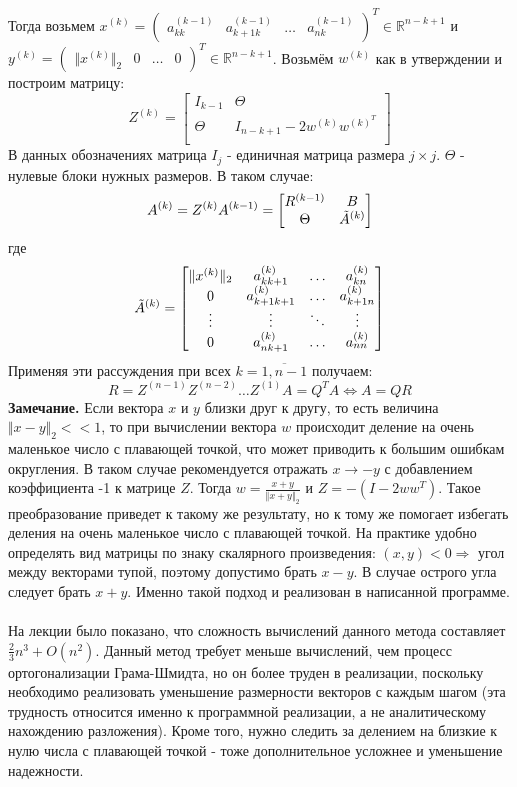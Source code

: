 \documentclass[a4paper,12pt,titlepage,final]{article}
\begin{document}
Тогда возьмем  $x^{(k)} = \begin{pmatrix} a_{kk}^{(k-1)} & a_{k+1k}^{(k-1)} & \ldots & a_{nk}^{(k-1)}\end{pmatrix}^T \in \mathbb{R}^{n-k+1}$ и  $y^{(k)} = \begin{pmatrix} \Vert x^{(k)} \Vert_2 & 0 & \ldots & 0\end{pmatrix}^T \in \mathbb{R}^{n-k+1}$. Возьмём $w^{(k)}$ как в утверждении и построим матрицу:
$$Z^{(k)} = \begin{bmatrix}
    I_{k-1} & \Theta \\
    \Theta & I_{n - k + 1} - 2w^{(k)}w^{(k)^T} \\
\end{bmatrix} $$
В данных обозначениях матрица $I_j$ - единичная матрица размера $j \times j$. $\Theta$ - нулевые блоки нужных размеров. В таком случае:
$$A^{(k)} = Z^{(k)}A^{(k-1)} = \begin{bmatrix}
    R^{(k-1)} & B \\
    \Theta & \Tilde{A}^{(k)}
\end{bmatrix}
$$
где $$
\Tilde{A}^{(k)} = \begin{bmatrix}
    \Vert x^{(k)} \Vert_2 & a_{kk+1}^{(k)} & \ldots & a_{kn}^{(k)} \\
    0 & a_{k+1k+1}^{(k)} & \ldots & a_{k+1n}^{(k)} \\
    \vdots & \vdots & \ddots & \vdots \\
    0 & a_{nk+1}^{(k)} & \ldots & a_{nn}^{(k)} \\
\end{bmatrix}
$$
Применяя эти рассуждения при всех $k = \overline{1, n-1}$ получаем:
$$R = Z^{(n-1)}Z^{(n-2)}\ldots Z^{(1)}A = Q^TA \Leftrightarrow A = QR$$
\textbf{Замечание.} Если вектора $x$ и $y$ близки друг к другу, то есть величина $\Vert x - y \Vert_2 << 1$, то при вычислении вектора $w$ происходит деление на очень маленькое число с плавающей точкой, что может приводить к большим ошибкам округления. В таком случае рекомендуется отражать $x \to -y$ с добавлением коэффициента -1 к матрице $Z$. Тогда $w = \frac{x + y}{\Vert x + y \Vert_2}$ и $Z = -(I - 2ww^T)$. Такое преобразование приведет к такому же результату, но к тому же помогает избегать деления на очень маленькое число с плавающей точкой. На практике удобно определять вид матрицы по знаку скалярного произведения: $(x, y) < 0 \Rightarrow $ угол между векторами тупой, поэтому допустимо брать $x - y$. В случае острого угла следует брать $x + y$. Именно такой подход и реализован в написанной программе.\\ \\
На лекции было показано, что сложность вычислений данного метода составляет $\frac{2}{3}n^3 + O(n^2)$. Данный метод требует меньше вычислений, чем процесс ортогонализации Грама-Шмидта, но он более труден в реализации, поскольку необходимо реализовать уменьшение размерности векторов с каждым шагом (эта трудность относится именно к программной реализации, а не аналитическому нахождению разложения). Кроме того, нужно следить за делением на близкие к нулю числа с плавающей точкой - тоже дополнительное усложнее и уменьшение надежности.
\end{document}
